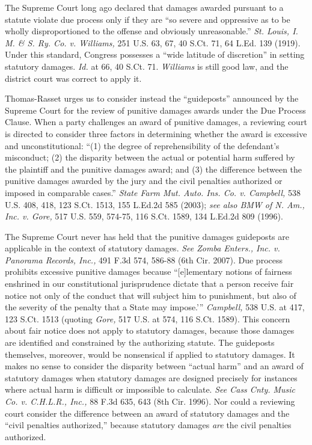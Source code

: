 The Supreme Court long ago declared that damages awarded pursuant to a statute
violate due process only if they are ``so severe and oppressive as to be wholly
disproportioned to the offense and obviously unreasonable.'' \textit{St. Louis,
I. M. \& S. Ry. Co. v. Williams,} 251 U.S. 63, 67, 40 S.Ct. 71, 64 L.Ed. 139
(1919). Under this standard, Congress possesses a ``wide latitude of
discretion'' in setting statutory damages. \textit{Id.} at 66, 40 S.Ct. 71.
\textit{Williams} is still good law, and the district court was correct to
apply it.

Thomas-Rasset urges us to consider instead the ``guideposts'' announced by the
Supreme Court for the review of punitive damages awards under the Due Process
Clause. When a party challenges an award of punitive damages, a reviewing court
is directed to consider three factors in determining whether the award is
excessive and unconstitutional: ``(1) the degree of reprehensibility of the
defendant's misconduct; (2) the disparity between the actual or potential harm
suffered by the plaintiff and the punitive damages award; and (3) the
difference between the punitive damages awarded by the jury and the civil
penalties authorized or imposed in comparable cases.'' \textit{State Farm Mut.
Auto. Ins. Co. v. Campbell,} 538 U.S. 408, 418, 123 S.Ct. 1513, 155 L.Ed.2d 585
(2003); \textit{see also BMW of N. Am., Inc. v. Gore,} 517 U.S. 559, 574-75,
116 S.Ct. 1589, 134 L.Ed.2d 809 (1996).

The Supreme Court never has held that the punitive damages guideposts are
applicable in the context of statutory damages. \textit{See Zomba Enters., Inc.
v. Panorama Records, Inc.,} 491 F.3d 574, 586-88 (6th Cir. 2007). Due process
prohibits excessive punitive damages because ``{\textasciigrave}[e]lementary
notions of fairness enshrined in our constitutional jurisprudence dictate that
a person receive fair notice not only of the conduct that will subject him to
punishment, but also of the severity of the penalty that a State may
impose.'{}'' \textit{Campbell,} 538 U.S. at 417, 123 S.Ct. 1513 (quoting
\textit{Gore,} 517 U.S. at 574, 116 S.Ct. 1589). This concern about fair notice
does not apply to statutory damages, because those damages are identified and
constrained by the authorizing statute. The guideposts themselves, moreover,
would be nonsensical if applied to statutory damages. It makes no sense to
consider the disparity between ``actual harm'' and an award of statutory
damages when statutory damages are designed precisely for instances where
actual harm is difficult or impossible to calculate. \textit{See Cass Cnty.
Music Co. v. C.H.L.R., Inc.,} 88 F.3d 635, 643 (8th Cir. 1996). Nor could a
reviewing court consider the difference between an award of statutory damages
and the ``civil penalties authorized,'' because statutory damages \textit{are}
the civil penalties authorized.

